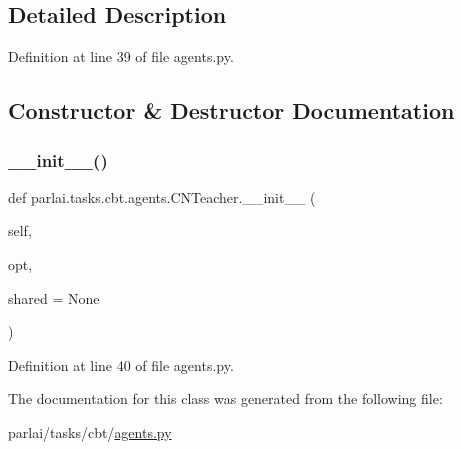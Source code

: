 \subsection{Detailed Description}


Definition at line 39 of file agents.\+py.



\subsection{Constructor \& Destructor Documentation}
\mbox{\label{classparlai_1_1tasks_1_1cbt_1_1agents_1_1CNTeacher_a68b96e17407acfb0c7583b2da47a1f51}} 
\subsubsection{\texorpdfstring{\+\_\+\+\_\+init\+\_\+\+\_\+()}{\_\_init\_\_()}}
{\footnotesize\ttfamily def parlai.\+tasks.\+cbt.\+agents.\+C\+N\+Teacher.\+\_\+\+\_\+init\+\_\+\+\_\+ (\begin{DoxyParamCaption}\item[{}]{self,  }\item[{}]{opt,  }\item[{}]{shared = {\ttfamily None} }\end{DoxyParamCaption})}



Definition at line 40 of file agents.\+py.



The documentation for this class was generated from the following file\+:\begin{DoxyCompactItemize}
\item 
parlai/tasks/cbt/\hyperlink{parlai_2tasks_2cbt_2agents_8py}{agents.\+py}\end{DoxyCompactItemize}
